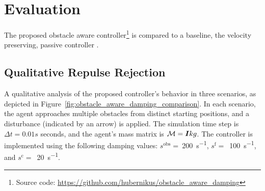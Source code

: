 \section{Evaluation}  \label{sec:evaluation} 
The proposed obstacle aware controller\footnote{Source code: \url{https://github.com/hubernikus/obstacle_aware_damping}} is compared to a baseline, the velocity preserving, passive controller \parencite{kronander2015passive}.

\iflong
\subsection{Qualitative Repulse Rejection} \label{sec:qual_comp}
A qualitative analysis of the proposed controller's behavior in three scenarios, as depicted in Figure~\ref{fig:obstacle_aware_damping_comparison}. In each scenario, the agent approaches multiple obstacles from distinct starting positions, and a disturbance (indicated by an arrow) is applied. The simulation time step is $\Delta t = 0.01 s$ seconds, and the agent's mass matrix is $\mathcal{M} = \boldsymbol{I} kg$. The controller is implemented using the following damping values:
$s^{\mathrm{obs}}=~$\qty{200}{s^{-1}},
$s^{\mathrm{f}}=$~\qty{100}{s^{-1}}, and
$s^{\mathrm{c}}=$~\qty{20}{s^{-1}}.

